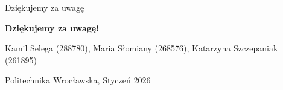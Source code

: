 \documentclass[aspectratio=169,12pt]{beamer}
\begin{document}
\begin{frame}{Dziękujemy za uwagę}
    \begin{center}
        \vspace{2cm}
        {\Huge\textbf{Dziękujemy za uwagę!}}

        \vspace{2cm}
        Kamil Selega (288780), Maria Słomiany (268576), Katarzyna Szczepaniak (261895)

        \vspace{0.3cm}
        Politechnika Wrocławska, Styczeń 2026
    \end{center}
\end{frame}
\end{document}
